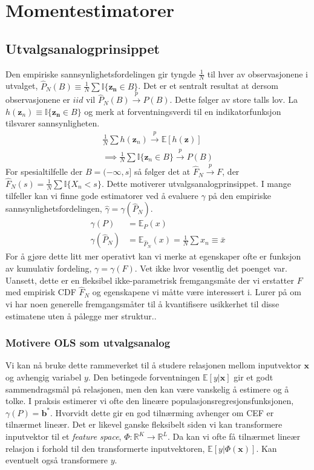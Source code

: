 \chapter{Momentestimatorer}
\section{Utvalgsanalogprinsippet}
Den empiriske sannsynlighetsfordelingen gir tyngde $\frac{1}{N}$ til hver av observasjonene i utvalget, $\hat{P}_N(B) \equiv \frac{1}{N}\sum \mathbb{I}\{\mathbf{z_n} \in B \}$. Det er et sentralt resultat at dersom observasjonene er $iid$ vil $\hat{P}_N(B) \overset{p}{\to} P(B)$. Dette følger av store talls lov. La $h(\mathbf{z}_n) \equiv \mathbb{I}\{\mathbf{z_n} \in B \}$ og merk at forventningsverdi til en indikatorfunksjon tilsvarer sannsynligheten. 
\begin{align}
\frac{1}{N}\sum h(\mathbf{z}_n) \overset{p}{\to} \mathbb{E}[h(\mathbf{z})] \\
\implies \frac{1}{N}\sum \mathbb{I}\{\mathbf{z}_n \in B \} \overset{p}{\to} P(B)
\end{align}
For spesialtilfelle der $B = (-\infty,s]$ så følger det at $\hat{F}_N \overset{p}{\rightarrow} F$, der $\hat{F}_N(s)=\frac{1}{N}\sum \mathbb{I}\{X_n < s\}$. Dette motiverer utvalgsanalogprinsippet. I mange tilfeller kan vi finne gode estimatorer ved å evaluere $\gamma$ på den empiriske sannsynlighetsfordelingen, $\hat{\gamma} = \gamma(\hat{P}_N)$. 
\begin{align}
\gamma(P) &= \mathbb{E}_P(x) \\
\gamma(\hat{P}_N) &= \mathbb{E}_{\hat{P}_N}(x) = \frac{1}{N}\sum x_n \equiv \bar{x}
\end{align}
For å gjøre dette litt mer operativt kan vi merke at egenskaper ofte er funksjon av kumulativ fordeling, $\gamma = \gamma(F)$. Vet ikke hvor vesentlig det poenget var. Uansett, dette er en fleksibel ikke-parametrisk fremgangsmåte der vi erstatter $F$ med empirisk CDF $\hat{F}_N$ og egenskapene vi måtte være interessert i. Lurer på om vi har noen generelle fremgangsmåter til å kvantifisere usikkerhet til disse estimatene uten å pålegge mer struktur..
\subsection{Motivere OLS som utvalgsanalog}
Vi kan nå bruke dette rammeverket til å studere relasjonen mellom inputvektor $\mathbf{x}$ og avhengig variabel $y$. Den betingede forventningen $\mathbb{E}[y|\mathbf{x}]$ gir et godt sammendragsmål på relasjonen, men den kan være vanskelig å estimere og å tolke. I praksis estimerer vi ofte den lineære populasjonsregresjonsfunksjonen, $\gamma (P) = \mathbf{b^*}$. Hvorvidt dette gir en god tilnærming avhenger om CEF er tilnærmet lineær. Det er likevel ganske fleksibelt siden vi kan transformere inputvektor til et \textit{feature space}, $ \Phi : \mathbb{R}^K \rightarrow \mathbb{R}^L$. Da kan vi ofte få tilnærmet lineær relasjon i forhold til den transformerte inputvektoren, $\mathbb{E}[y|\Phi(\mathbf{x})]$. Kan eventuelt også transformere $y$.

